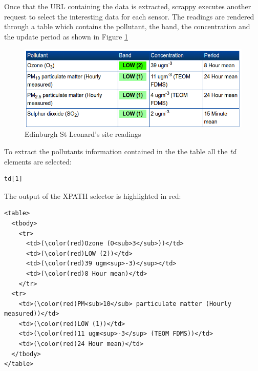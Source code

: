 Once that the URL containing the data is extracted, scrappy executes another request to select the interesting data for each sensor. The readings are rendered through a table which contains the pollutant, the band, the concentration and the update period as shown in Figure \ref{fig:pollution_site readings}

\begin{figure}[H]
\begin{adjustbox}{width=.5\textwidth,center=\textwidth}
  \centering
  \includegraphics[scale=1]{images/site_readings.png}
\end{adjustbox}
  \caption[Edinburgh St Leonard's site readings]{Edinburgh St Leonard's site readings \footnotemark}
  \label{fig:pollution_site readings}
\end{figure}

To extract the pollutants information contained in the the table all the \textit{td} elements are selected: 

{\centering
\begin{BVerbatim}
td[1]
\end{BVerbatim}
\par
}\bigskip

The output of the XPATH selector is highlighted in red: 

\begin{Verbatim}[fontsize=\small,commandchars=\\\(\)]
<table>
  <tbody>
    <tr>
      <td>(\color(red)Ozone (O<sub>3</sub>))</td>
      <td>(\color(red)LOW (2))</td>
      <td>(\color(red)39 ugm<sup>-3)</sup></td>
      <td>(\color(red)8 Hour mean)</td>
    </tr>
  <tr>
    <td>(\color(red)PM<sub>10</sub> particulate matter (Hourly measured))</td>
    <td>(\color(red)LOW (1))</td>
    <td>(\color(red)11 ugm<sup>-3</sup> (TEOM FDMS))</td>
    <td>(\color(red)24 Hour mean)</td>
  </tbody>
</table>                
\end{Verbatim}

